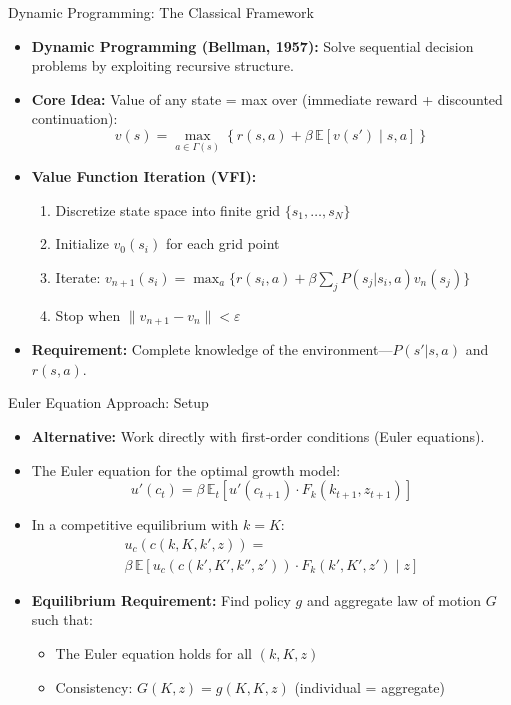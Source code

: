 \begin{frame}{Dynamic Programming: The Classical Framework}
\begin{itemize}
\item \textbf{Dynamic Programming (Bellman, 1957):} Solve sequential decision problems by exploiting recursive structure.

\medskip
\item \textbf{Core Idea:} Value of any state = max over (immediate reward + discounted continuation):
\[
v(s) = \max_{a \in \Gamma(s)} \left\{ r(s, a) + \beta \, \mathbb{E}\left[ v(s') \mid s, a \right] \right\}
\]

\medskip
\item \textbf{Value Function Iteration (VFI):}
\begin{enumerate}
    \item Discretize state space into finite grid $\{s_1, \ldots, s_N\}$
    \item Initialize $v_0(s_i)$ for each grid point
    \item Iterate: $v_{n+1}(s_i) = \max_{a} \{ r(s_i, a) + \beta \sum_j P(s_j|s_i,a) v_n(s_j) \}$
    \item Stop when $\|v_{n+1} - v_n\| < \varepsilon$
\end{enumerate}

\medskip
\item \textbf{Requirement:} Complete knowledge of the environment---$P(s'|s,a)$ and $r(s,a)$.
\end{itemize}
\end{frame}

\begin{frame}{Euler Equation Approach: Setup}
\begin{itemize}
\item \textbf{Alternative:} Work directly with first-order conditions (Euler equations).

\medskip
\item The Euler equation for the optimal growth model:
\[
u'(c_t) = \beta \, \mathbb{E}_t \left[ u'(c_{t+1}) \cdot F_k(k_{t+1}, z_{t+1}) \right]
\]

\medskip
\item In a competitive equilibrium with $k = K$:
\begin{multline*}
u_c(c(k,K,k',z)) = \\
\beta \, \mathbb{E} \left[ u_c(c(k',K',k'',z')) \cdot F_k(k',K',z') \mid z \right]
\end{multline*}

\medskip
\item \textbf{Equilibrium Requirement:} Find policy $g$ and aggregate law of motion $G$ such that:
\begin{itemize}
    \item The Euler equation holds for all $(k, K, z)$
    \item Consistency: $G(K, z) = g(K, K, z)$ (individual = aggregate)
\end{itemize}
\end{itemize}
\end{frame}

